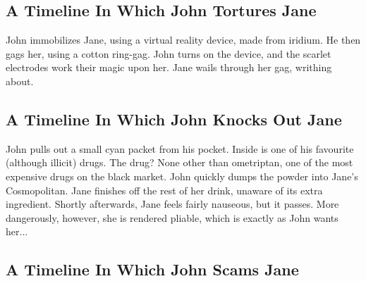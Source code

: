 \documentclass{article}
\begin{document}
\subsection{A Timeline In Which John Tortures Jane}


John immobilizes Jane, using a virtual reality device, made from iridium.
He then gags her, using a cotton ring{-}gag.
John turns on the device, and the scarlet electrodes work their magic upon her.
Jane wails through her gag, writhing about.
\subsection{A Timeline In Which John Knocks Out Jane}


John pulls out a small cyan packet from his pocket. Inside is one of his favourite (although illicit) drugs.
The drug? None other than ometriptan, one of the most expensive drugs on the black market.
John quickly dumps the powder into Jane's Cosmopolitan.
Jane finishes off the rest of her drink, unaware of its extra ingredient.
Shortly afterwards, Jane feels fairly nauseous, but it passes.
More dangerously, however, she is rendered pliable, which is exactly as John wants her...
\subsection{A Timeline In Which John Scams Jane}
\end{document}
